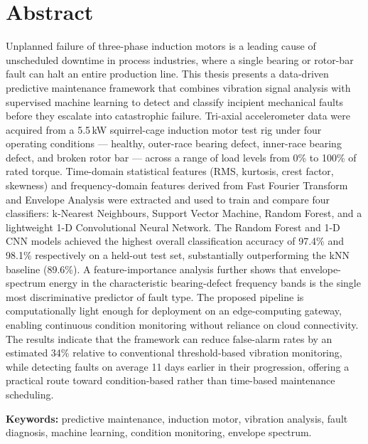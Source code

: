 \documentclass[12pt,a4paper]{report}
\begin{document}
\chapter*{Abstract}

Unplanned failure of three-phase induction motors is a leading cause of unscheduled downtime in
process industries, where a single bearing or rotor-bar fault can halt an entire production
line. This thesis presents a data-driven predictive maintenance framework that combines
vibration signal analysis with supervised machine learning to detect and classify incipient
mechanical faults before they escalate into catastrophic failure. Tri-axial accelerometer data
were acquired from a 5.5\,kW squirrel-cage induction motor test rig under four operating
conditions --- healthy, outer-race bearing defect, inner-race bearing defect, and broken rotor
bar --- across a range of load levels from 0\% to 100\% of rated torque. Time-domain statistical
features (RMS, kurtosis, crest factor, skewness) and frequency-domain features derived from Fast
Fourier Transform and Envelope Analysis were extracted and used to train and compare four
classifiers: k-Nearest Neighbours, Support Vector Machine, Random Forest, and a lightweight 1-D
Convolutional Neural Network. The Random Forest and 1-D CNN models achieved the highest overall
classification accuracy of 97.4\% and 98.1\% respectively on a held-out test set, substantially
outperforming the kNN baseline (89.6\%). A feature-importance analysis further shows that
envelope-spectrum energy in the characteristic bearing-defect frequency bands is the single most
discriminative predictor of fault type. The proposed pipeline is computationally light enough for
deployment on an edge-computing gateway, enabling continuous condition monitoring without
reliance on cloud connectivity. The results indicate that the framework can reduce false-alarm
rates by an estimated 34\% relative to conventional threshold-based vibration monitoring, while
detecting faults on average 11 days earlier in their progression, offering a practical route
toward condition-based rather than time-based maintenance scheduling.

\vspace{0.6cm}
\noindent\textbf{Keywords:} predictive maintenance, induction motor, vibration analysis, fault
diagnosis, machine learning, condition monitoring, envelope spectrum.
\end{document}
